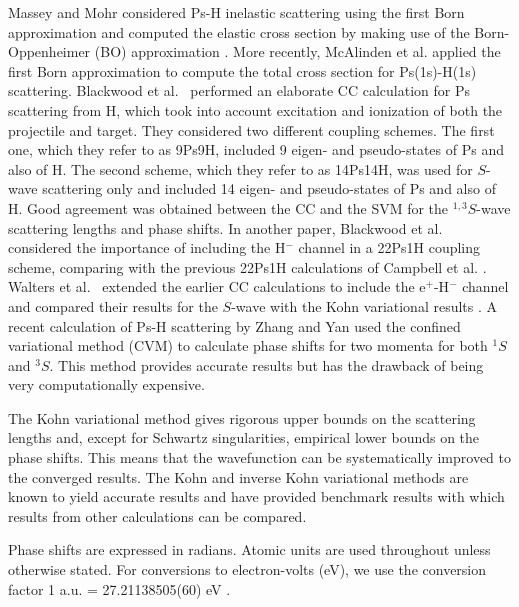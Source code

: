 \documentclass[preprint,showpacs,showkeys,preprintnumbers,amsmath,amssymb,longbibliography,pra,aps]{revtex4-1}
\begin{document}
Massey and Mohr \cite{Massey1954} considered Ps-H inelastic scattering using the first Born
approximation and computed the elastic cross section by making use of the
Born-Oppenheimer (BO) approximation
\cite{Massey1954,Oppenheimer1928,Geltman1969,Mott1965,Bransden2003}.
More recently, McAlinden et al. \cite{McAlinden1996}
applied the first Born approximation to compute the total cross section for
Ps(1s)-H(1s) scattering.
Blackwood et al.~\cite{Blackwood2002} performed an elaborate CC calculation 
for Ps scattering from H, which took into account excitation and ionization 
of both the projectile and target. They considered two different coupling 
schemes. The first one, which they refer to as 9Ps9H, included 9 eigen- and 
pseudo-states of Ps and also of H. The second scheme, which they refer to as 
14Ps14H, was used for $S$-wave scattering only and included
14 eigen- and pseudo-states of 
Ps and also of H. Good agreement was obtained between the CC
\cite{Blackwood2002} and the SVM \cite{Ivanov2002} for the $^{1,3}S$-wave scattering
lengths and phase shifts. In another paper, Blackwood et
al.~\cite{Blackwood2002b} considered the importance of including the H$^-$
channel in a 22Ps1H coupling scheme, comparing with the previous 22Ps1H
calculations of Campbell et al. \cite{Campbell1998}. Walters et
al.~\cite{Walters2004} extended the earlier CC calculations
\cite{Blackwood2002} to include the e$^+$-H$^-$ channel
\cite{Blackwood2002b} and compared their results for the $S$-wave with the
Kohn variational results \cite{VanReeth2003}.
A recent calculation of Ps-H scattering by Zhang and Yan
\cite{Zhang2012} used the
confined variational method (CVM) to calculate phase shifts for two momenta
for both $^1S$ and $^3S$. This method provides accurate
results but has the drawback of being very computationally expensive.

The Kohn variational method gives rigorous upper bounds on the scattering lengths
and, except for Schwartz singularities, empirical lower bounds on the
phase shifts. This means that the wavefunction can be systematically improved
to the converged results. The Kohn and inverse Kohn
variational methods are known to yield accurate results and have provided 
benchmark results \cite{VanReeth2003,VanReeth2004} with which results from 
other calculations can be compared.

Phase shifts are expressed in radians. Atomic units are used throughout 
unless otherwise stated. For conversions to electron-volts (eV), we use the 
conversion factor 1 a.u. = {27.21138505(60) eV}
\cite{Mohr2012,*NISTConversions}.
\end{document}
